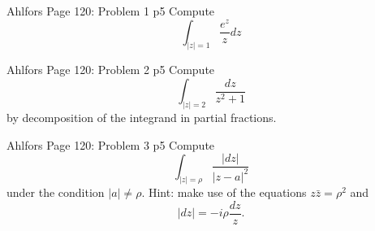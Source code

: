 \documentclass[a4paper, 11pt]{article}
\begin{document}
	
	
	\begin{problem}{%
			Ahlfors Page 120: Problem 1
		}{p5%
		}
	Compute
	$$
	\int_{|z|=1} \frac{e^z}{z} d z
	$$
	\end{problem}
	
	\begin{problem}{%
			Ahlfors Page 120: Problem 2
		}{p5%
		}
		Compute
		$$
		\int_{|z|=2} \frac{d z}{z^2+1}
		$$
		by decomposition of the integrand in partial fractions.

	\end{problem}
	
		
	\pagebreak 
	
	\begin{problem}{%
			Ahlfors Page 120: Problem 3
				}{p5%
		}
	Compute
	$$
	\int_{|z|=\rho} \frac{|d z|}{|z-a|^2}
	$$
	under the condition $|a| \neq \rho$. Hint: make use of the equations $z \bar{z}=\rho^2$ and
	$$
	|d z|=-i \rho \frac{d z}{z} .
	$$
		
	\end{problem}
	
\end{document}
